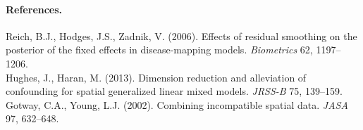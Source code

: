 \documentclass[11pt]{article}
\begin{document}
\paragraph{References.}
Reich, B.J., Hodges, J.S., Zadnik, V. (2006). Effects of residual smoothing on the
posterior of the fixed effects in disease-mapping models. \emph{Biometrics} 62,
1197--1206.\\
Hughes, J., Haran, M. (2013). Dimension reduction and alleviation of confounding
for spatial generalized linear mixed models. \emph{JRSS-B} 75, 139--159.\\
Gotway, C.A., Young, L.J. (2002). Combining incompatible spatial data.
\emph{JASA} 97, 632--648.
\end{document}
